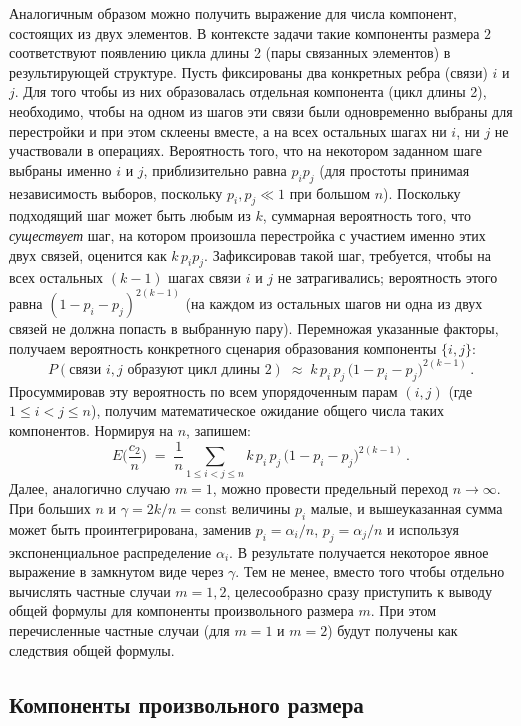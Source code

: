Аналогичным образом можно получить выражение для числа компонент, состоящих из двух элементов. В контексте задачи такие компоненты размера $2$ соответствуют появлению цикла длины 2 (пары связанных элементов) в результирующей структуре. Пусть фиксированы два конкретных ребра (связи) $i$ и $j$. Для того чтобы из них образовалась отдельная компонента (цикл длины 2), необходимо, чтобы на одном из шагов эти связи были одновременно выбраны для перестройки и при этом склеены вместе, а на всех остальных шагах ни $i$, ни $j$ не участвовали в операциях. Вероятность того, что на некотором заданном шаге выбраны именно $i$ и $j$, приблизительно равна $p_i p_j$ (для простоты принимая независимость выборов, поскольку $p_i, p_j \ll 1$ при большом $n$). Поскольку подходящий шаг может быть любым из $k$, суммарная вероятность того, что \emph{существует} шаг, на котором произошла перестройка с участием именно этих двух связей, оценится как $k\,p_i p_j$. Зафиксировав такой шаг, требуется, чтобы на всех остальных $(k-1)$ шагах связи $i$ и $j$ не затрагивались; вероятность этого равна $(1 - p_i - p_j)^{2(k-1)}$ (на каждом из остальных шагов ни одна из двух связей не должна попасть в выбранную пару). Перемножая указанные факторы, получаем вероятность конкретного сценария образования компоненты $\{i,j\}$: 
\[ 
P(\text{связи $i,j$ образуют цикл длины $2$}) \;\approx\; k\, p_i\, p_j\, \big(1 - p_i - p_j\big)^{2(k-1)}\,.
\] 
Просуммировав эту вероятность по всем упорядоченным парам $(i,j)$ (где $1 \le i < j \le n$), получим математическое ожидание общего числа таких компонентов. Нормируя на $n$, запишем:
\[
E\!\Big(\frac{c_2}{n}\Big) \;=\; \frac{1}{n} \sum_{1 \le i < j \le n} k\, p_i\, p_j\, \big(1 - p_i - p_j\big)^{2(k-1)}\,.
\]
Далее, аналогично случаю $m=1$, можно провести предельный переход $n \to \infty$. При больших $n$ и $\gamma = 2k/n = \text{const}$ величины $p_i$ малые, и вышеуказанная сумма может быть проинтегрирована, заменив $p_i = \alpha_i/n$, $p_j = \alpha_j/n$ и используя экспоненциальное распределение $\alpha_i$. В результате получается некоторое явное выражение в замкнутом виде через $\gamma$. Тем не менее, вместо того чтобы отдельно вычислять частные случаи $m=1,2$, целесообразно сразу приступить к выводу общей формулы для компоненты произвольного размера $m$. При этом перечисленные частные случаи (для $m=1$ и $m=2$) будут получены как следствия общей формулы.

\subsection{Компоненты произвольного размера}

